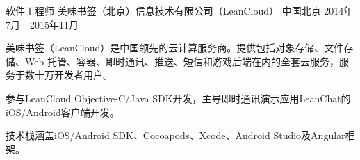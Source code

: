 \begin{cventries}
\cventry
{软件工程师} %
{美味书签（北京）信息技术有限公司（LeanCloud）} %
{中国北京} %
{2014年7月 - 2015年11月} %
{
  \begin{cvitems} %
    \item {美味书签（LeanCloud）是中国领先的云计算服务商。提供包括对象存储、文件存储、Web 托管、容器、即时通讯、推送、短信和游戏后端在内的全套云服务，服务于数十万开发者用户。}
    \item {参与LeanCloud Objective-C/Java SDK开发，主导即时通讯演示应用LeanChat的iOS/Android客户端开发。}
    \item {技术栈涵盖iOS/Android SDK、Cocoapods、Xcode、Android Studio及Angular框架。}
  \end{cvitems}
}

\end{cventries}
